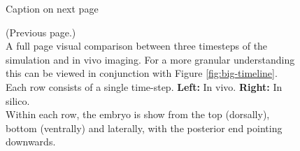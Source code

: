 \begin{figure}[H]
    \centering
    \vspace*{-1cm}\hspace*{-1cm}
    \caption{Caption on next page}
    \label{fig:big-visual-comparison}
\end{figure}
\newpage
\addtocounter{figure}{-1}
\begin{figure} [t!]
  \caption{(Previous page.) \\A full page visual comparison between three timesteps of the simulation and in vivo imaging. For a more granular understanding this can be viewed in conjunction with Figure \ref{fig:big-timeline}.\\
  Each row consists of a single time-step. \textbf{Left:} In vivo. \textbf{Right:} In silico.\\Within each row, the embryo is show from the top (dorsally), bottom (ventrally) and laterally, with the posterior end pointing downwards.
  }
\end{figure}

